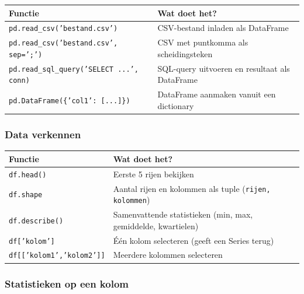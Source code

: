 \documentclass[a4paper,11pt]{article}
\begin{document}
\begin{center}
\renewcommand{\arraystretch}{1.3}
\begin{tabularx}{\linewidth}{@{}lX@{}}
\toprule
\textbf{Functie} & \textbf{Wat doet het?} \\
\midrule
\texttt{pd.read\_csv('bestand.csv')} & CSV-bestand inladen als DataFrame \\
\texttt{pd.read\_csv('bestand.csv', sep=';')} & CSV met puntkomma als scheidingsteken \\
\texttt{pd.read\_sql\_query('SELECT ...', conn)} & SQL-query uitvoeren en resultaat als DataFrame \\
\texttt{pd.DataFrame(\{'col1': [...]\})} & DataFrame aanmaken vanuit een dictionary \\
\bottomrule
\end{tabularx}
\end{center}

\subsubsection*{Data verkennen}

\begin{center}
\renewcommand{\arraystretch}{1.3}
\begin{tabularx}{\linewidth}{@{}lX@{}}
\toprule
\textbf{Functie} & \textbf{Wat doet het?} \\
\midrule
\texttt{df.head()} & Eerste 5 rijen bekijken \\
\texttt{df.shape} & Aantal rijen en kolommen als tuple (\texttt{rijen, kolommen}) \\
\texttt{df.describe()} & Samenvattende statistieken (min, max, gemiddelde, kwartielen) \\
\texttt{df['kolom']} & Één kolom selecteren (geeft een Series terug) \\
\texttt{df[['kolom1','kolom2']]} & Meerdere kolommen selecteren \\
\bottomrule
\end{tabularx}
\end{center}

\subsubsection*{Statistieken op een kolom}
\end{document}

